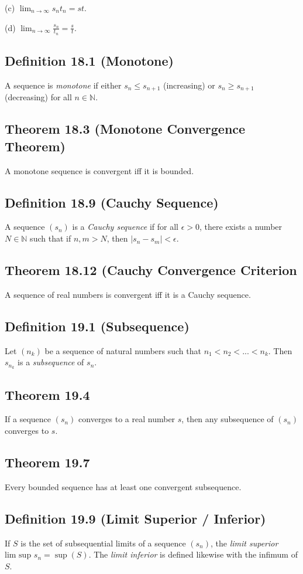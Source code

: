 \documentclass{book}
\begin{document}
(c) $\lim_{n \rightarrow \infty} s_nt_n = st$. 

(d) $\lim_{n \rightarrow \infty} \frac{s_n}{t_n} = \frac{s}{t}$. 

\subsection*{Definition 18.1 (Monotone)}

A sequence is \emph{monotone} if either $s_n \leq s_{n+1}$ (increasing) or $s_n \geq s_{n+1}$ (decreasing) for all $n \in \mathbb{N}$. 

\subsection*{Theorem 18.3 (Monotone Convergence Theorem)}

A monotone sequence is convergent iff it is bounded. 

\subsection*{Definition 18.9 (Cauchy Sequence)}

A sequence $(s_n)$ is a \emph{Cauchy sequence} if for all $\epsilon > 0$, there exists a number $N \in \mathbb{N}$ such that if $n, m  > N$, then $\left|s_n - s_m \right| < \epsilon$. 

\subsection*{Theorem 18.12 (Cauchy Convergence Criterion}

A sequence of real numbers is convergent iff it is a Cauchy sequence. 

\subsection*{Definition 19.1 (Subsequence)}

Let $(n_k)$ be a sequence of natural numbers such that $n_1 < n_2 < ... < n_k$. Then $s_{n_k}$ is a \emph{subsequence} of $s_n$. 

\subsection*{Theorem 19.4}

If a sequence $(s_n)$ converges to a real number $s$, then any subsequence of $(s_n)$ converges to $s$. 

\subsection*{Theorem 19.7}

Every bounded sequence has at least one convergent subsequence. 

\subsection*{Definition 19.9 (Limit Superior / Inferior)}

If $S$ is the set of subsequential limits of a sequence $(s_n)$, the \emph{limit superior} $\text{lim sup }s_n = \sup(S)$. The \emph{limit inferior} is defined likewise with the infimum of $S$. 
\end{document}
